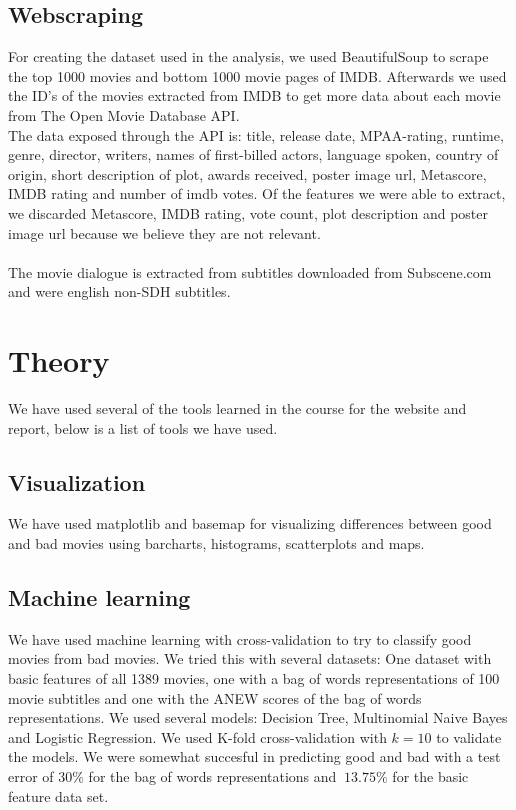 \documentclass{acm_proc_article-sp}
\begin{document}
\subsection{Webscraping}
For creating the dataset used in the analysis, we used BeautifulSoup\cite{BS4} to scrape the top 1000 movies and bottom 1000 movie pages of IMDB\cite{IMDB}. Afterwards we used the ID's of the movies extracted from IMDB to get more data about each movie from The Open Movie Database API\cite{OMDB}.\\ The data exposed through the API is: title, release date, MPAA-rating, runtime, genre, director, writers, names of first-billed actors, language spoken, country of origin, short description of plot, awards received, poster image url, Metascore, IMDB rating and number of imdb votes.
Of the features we were able to extract, we discarded Metascore, IMDB rating, vote count, plot description and poster image url because we believe they are not relevant.\\\\
The movie dialogue is extracted from subtitles downloaded from Subscene.com\cite{subscene} and were english non-SDH subtitles.

\section{Theory}
We have used several of the tools learned in the course for the website and report, below is a list of tools we have used.
\subsection{Visualization}
We have used matplotlib and basemap for visualizing differences between good and bad movies using barcharts, histograms, scatterplots and maps.
\subsection{Machine learning}
We have used machine learning with cross-validation to try to classify good movies from bad movies. We tried this with several datasets: One dataset with basic features of all 1389 movies, one with a bag of words representations of 100 movie subtitles and one with the ANEW scores of the bag of words representations. We used several models: Decision Tree, Multinomial Naive Bayes and Logistic Regression. We used K-fold cross-validation with $k=10$ to validate the models. We were somewhat succesful in predicting good and bad with a test error of 30\% for the bag of words representations and $~13.75\%$ for the basic feature data set.
\end{document}
